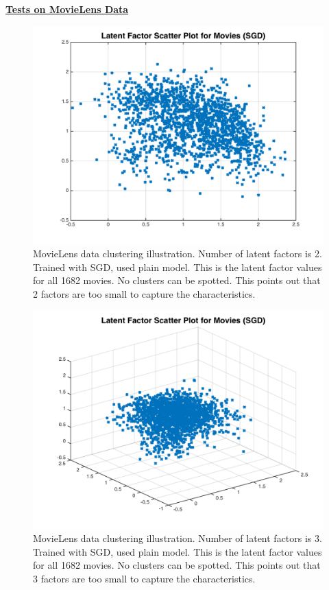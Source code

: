 \documentclass[11pt]{article}
\begin{document}
	\begin{center}
		\Large \textbf{\underline{Tests on MovieLens Data}}
	\end{center}		
	
	
	
	\begin{figure}[H]
		\centering		
		\includegraphics[width=\wiq]{buff5/movs}
		\caption{MovieLens data clustering illustration. Number of latent factors is 2. Trained with SGD, used plain model. This is the latent factor values for all 1682 movies. No clusters can be spotted. This points out that 2 factors are too small to capture the characteristics.}
		\label{5}		
	\end{figure}
	\begin{figure}[H]
		\centering		
		\includegraphics[width=\wi]{buff5/movs2}
		\caption{MovieLens data clustering illustration. Number of latent factors is 3. Trained with SGD, used plain model. This is the latent factor values for all 1682 movies. No clusters can be spotted. This points out that 3 factors are too small to capture the characteristics.}
		\label{5}		
	\end{figure}
\end{document}
